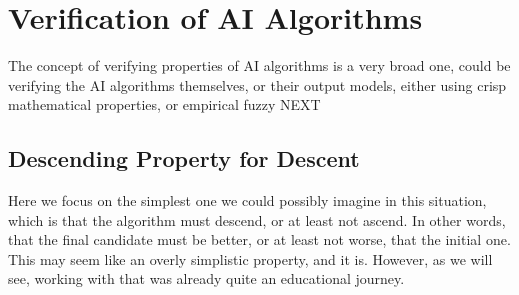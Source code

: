 \documentclass[]{report}
\begin{document}
\section{Verification of AI Algorithms}

The concept of verifying properties of AI algorithms is a very broad
one, could be verifying the AI algorithms themselves, or their output
models, either using crisp mathematical properties, or empirical fuzzy
NEXT

\subsection{Descending Property for Descent}
Here we focus on the simplest one we could possibly imagine in this
situation, which is that the algorithm must descend, or at least not
ascend.  In other words, that the final candidate must be better, or
at least not worse, that the initial one.  This may seem like an
overly simplistic property, and it is.  However, as we will see,
working with that was already quite an educational journey.
\end{document}
